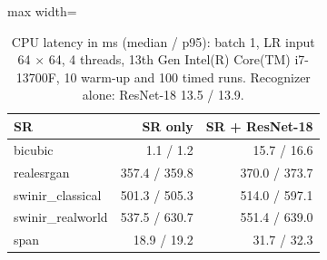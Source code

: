 \begin{table}[t]
\centering
\footnotesize
\caption{CPU latency in ms (median / p95): batch 1, LR input 64 $\times$ 64, 4 threads, 13th Gen Intel(R) Core(TM) i7-13700F, 10 warm-up and 100 timed runs. Recognizer alone: ResNet-18 13.5 / 13.9.}
\label{tab:latency}
\begin{adjustbox}{max width=\linewidth}
\begin{tabular}{lrr}
\toprule
SR & SR only & SR + ResNet-18 \\
\midrule
bicubic & 1.1 / 1.2 & 15.7 / 16.6 \\
realesrgan & 357.4 / 359.8 & 370.0 / 373.7 \\
swinir\_classical & 501.3 / 505.3 & 514.0 / 597.1 \\
swinir\_realworld & 537.5 / 630.7 & 551.4 / 639.0 \\
span & 18.9 / 19.2 & 31.7 / 32.3 \\
\bottomrule
\end{tabular}
\end{adjustbox}
\end{table}
